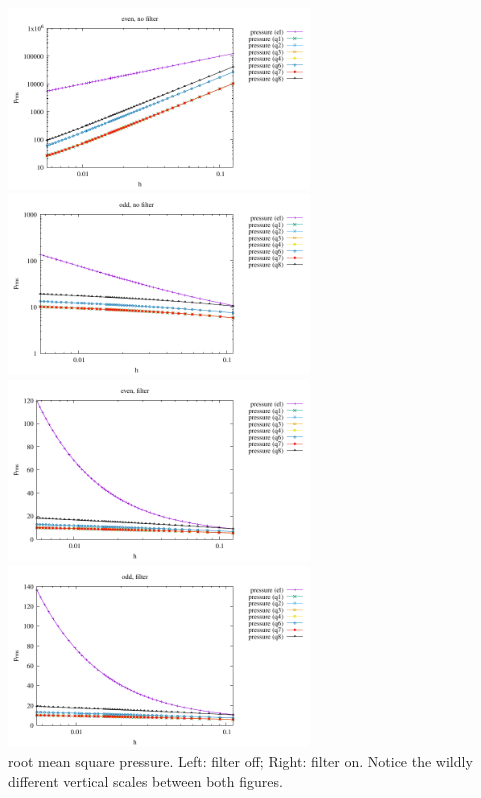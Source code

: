 \begin{center}
\includegraphics[width=8cm]{python_codes/fieldstone_12/results/ldc/prms_even_nofilter}
\includegraphics[width=8cm]{python_codes/fieldstone_12/results/ldc/prms_odd_nofilter}\\
\includegraphics[width=8cm]{python_codes/fieldstone_12/results/ldc/prms_even_filter}
\includegraphics[width=8cm]{python_codes/fieldstone_12/results/ldc/prms_odd_filter}\\
{\captionfont root mean square pressure. Left: filter off; Right: filter on.
Notice the wildly different vertical scales between both figures.}
\end{center}

